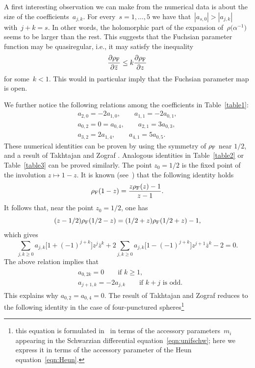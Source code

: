 \documentclass[pdftex]{sigma}
\numberwithin{equation}{section}
\begin{document}
A first interesting observation we can make from the numerical data is about the size of the coefficients~$a_{j,k}$. For every~$s=1,\dots,5$ we have that~$|a_{s,0}|>|a_{j,k}|$ with~$j+k=s$. In other words, the holomorphic part of the expansion of~$\rho\big(\alpha^{-1}\big)$ seems to be larger than the rest. This suggests that the Fuchsian parameter function may be quasiregular, i.e., it may satisfy the inequality
\[
\frac{\partial{\rho_{\rm F}}}{\partial\bar{z}} \le k\frac{\partial\rho_{\rm F}}{\partial z}
\]
for some~$k<1$. This would in particular imply that the Fuchsian parameter map is open.

We further notice the following relations among the coefficients in Table~\ref{table1}:
\begin{gather}\label{eqn:boh1}
a_{2,0}=-2a_{1,0},\qquad a_{1,1}=-2a_{0,1},\\
a_{0,2}=0=a_{0,4},\qquad
a_{2,1}=3a_{0,3},\\
\label{eqn:boh4}
a_{3,2}=2a_{1,4},\qquad a_{4,1}=5a_{0,5}.
\end{gather}
These numerical identities can be proven by using the symmetry of $\rho_{\rm F}$ near $1/2$, and a result of Takhtajan and Zograf \cite{TZ1}. Analogous identities in Table~\ref{table2} or Table~\ref{table3} can be proved similarly.
The point $z_0=1/2$ is the fixed point of the involution $z\mapsto 1-z$. It is known (see~\cite{KRV}) that the following identity holds
\[
\rho_{\rm F}(1-z) = \frac{z\rho_{\rm F}(z)-1}{z-1}.
\]
It follows that, near the point $z_0=1/2$, one has
\[
(z-1/2)\rho_{\rm F}(1/2-z)=(1/2+z)\rho_{\rm F}(1/2+z)-1,
\]
which gives
\begin{equation}\label{eqn:uno}
\sum_{j,k\ge 0}{a_{j,k}\big[1+(-1)^{j+k}\big]z^j\overline{z}^k}+2\sum_{j,k\ge 0}{a_{j,k}\big[1-(-1)^{j+k}\big]z^{j+1}\overline{z}^k}-2=0.
\end{equation}
The above relation implies that
\begin{gather*}
\begin{split}
& a_{0,2k}=0\qquad\text{if } k\ge 1, \\
& a_{j+1,k}=-2a_{j,k}\qquad\text{if }k+j\text{ is odd}.
\end{split}
\end{gather*}
This explains why $a_{0,2}=a_{0,4}=0$.
The result of Takhtajan and Zograf \cite[formula~(4.1)]{TZ1} reduces to the following identity in the case of four-punctured spheres\footnote{this equation is formulated in~\cite{TZ1} in terms of the accessory parameters~$m_i$ appearing in the Schwarzian differential equation~\eqref{eqn:unifschw}; here we express it in terms of the accessory parameter of the Heun equation~\eqref{eqn:Heun}.}
\end{document}
